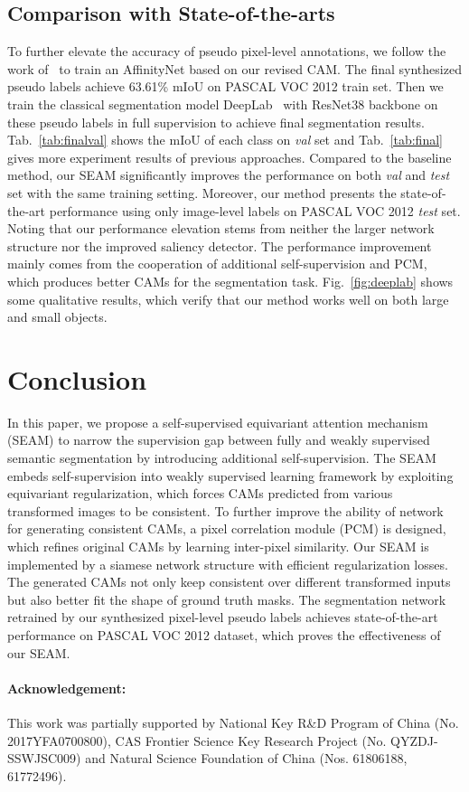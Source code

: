 \documentclass[10pt,twocolumn,letterpaper]{article}
\begin{document}
	\subsection{Comparison with State-of-the-arts}
	To further elevate the accuracy of pseudo pixel-level annotations, we follow the work of~\cite{AffinityNet} to train an AffinityNet based on our revised CAM. The final synthesized pseudo labels achieve 63.61\% mIoU on PASCAL VOC 2012 train set. Then we train the classical segmentation model DeepLab~\cite{DeepLabv1} with ResNet38 backbone on these pseudo labels in full supervision to achieve final segmentation results. Tab.~\ref{tab:finalval} shows the mIoU of each class on \textit{val} set and Tab.~\ref{tab:final} gives more experiment results of previous approaches. Compared to the baseline method, our SEAM significantly improves the performance on both \textit{val} and \textit{test} set with the same training setting. Moreover, our method presents the state-of-the-art performance using only image-level labels on PASCAL VOC 2012 \textit{test} set. Noting that our performance elevation stems from neither the larger network structure nor the improved saliency detector. The performance improvement mainly comes from the cooperation of additional self-supervision and PCM, which produces better CAMs for the segmentation task. Fig.~\ref{fig:deeplab} shows some qualitative results, which verify that our method works well on both large and small objects. 
	
	\section{Conclusion}
	In this paper, we propose a self-supervised equivariant attention mechanism (SEAM) to narrow the supervision gap between fully and weakly supervised semantic segmentation by introducing additional self-supervision. The SEAM embeds self-supervision into weakly supervised learning framework by exploiting equivariant regularization, which forces CAMs predicted from various transformed images to be consistent. To further improve the ability of network for generating consistent CAMs, a pixel correlation module (PCM) is designed, which refines original CAMs by learning inter-pixel similarity. Our SEAM is implemented by a siamese network structure with efficient regularization losses. The generated CAMs not only keep consistent over different transformed inputs but also better fit the shape of ground truth masks. The segmentation network retrained by our synthesized pixel-level pseudo labels achieves state-of-the-art performance on PASCAL VOC 2012 dataset, which proves the effectiveness of our SEAM.

	\paragraph{Acknowledgement:}
	This work was partially supported by National Key R\&D Program of China (No. 2017YFA0700800), CAS\; Frontier\; Science\; Key\; Research\; Project\; (No.\; QYZDJ-SSWJSC009) and Natural Science Foundation of China (Nos. 61806188, 61772496).
	
	{\small
		
		
	}
	
\end{document}
